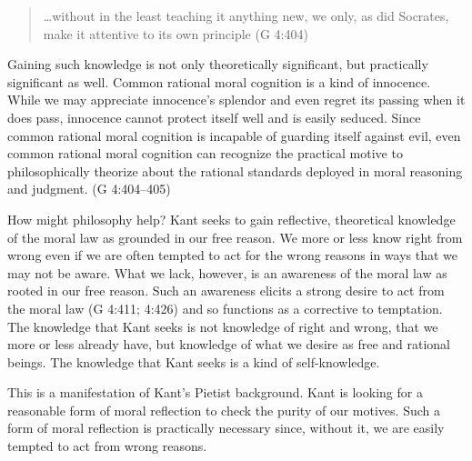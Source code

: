\begin{quote}
	\ldots without in the least teaching it anything new, we only, as did Socrates, make it attentive to its own principle (G 4:404)
\end{quote}

Gaining such knowledge is not only theoretically significant, but practically significant as well. Common rational moral cognition is a kind of innocence. While we may appreciate innocence’s splendor and even regret its passing when it does pass, innocence cannot protect itself well and is easily seduced. Since common rational moral cognition is incapable of guarding itself against evil, even common rational moral cognition can recognize the practical motive to philosophically theorize about the rational standards deployed in moral reasoning and judgment. (G 4:404–405)

How might philosophy help? Kant seeks to gain reflective, theoretical knowledge of the moral law as grounded in our free reason. We more or less know right from wrong even if we are often tempted to act for the wrong reasons in ways that we may not be aware. What we lack, however, is an awareness of the moral law as rooted in our free reason. Such an awareness elicits a strong desire to act from the moral law (G 4:411; 4:426) and so functions as a corrective to temptation. The knowledge that Kant seeks is not knowledge of right and wrong, that we more or less already have, but knowledge of what we desire as free and rational beings. The knowledge that Kant seeks is a kind of self-knowledge.

This is a manifestation of Kant’s Pietist background. Kant is looking for a reasonable form of moral reflection to check the purity of our motives. Such a form of moral reflection is practically necessary since, without it, we are easily tempted to act from wrong reasons. 

% 


